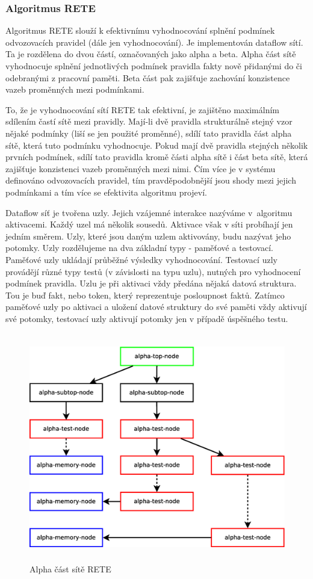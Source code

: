 \subsubsection{Algoritmus RETE}
\label{rete}

Algoritmus RETE slouží k efektivnímu vyhodnocování splnění podmínek odvozovacích
pravidel (dále jen vyhodnocování). Je implementován dataflow sítí. Ta je
rozdělena do dvou částí, označovaných jako alpha a beta. Alpha část sítě
vyhodnocuje splnění jednotlivých podmínek pravidla fakty nově přidanými do či
odebranými z pracovní paměti. Beta část pak zajišťuje zachování konzistence
vazeb proměnných mezi podmínkami.

To, že je vyhodnocování sítí RETE tak efektivní, je zajištěno maximálním
sdílením častí sítě mezi pravidly. Mají-li dvě pravidla strukturálně stejný vzor
nějaké podmínky (liší se jen použité proměnné), sdílí tato pravidla část alpha
sítě, která tuto podmínku vyhodnocuje. Pokud mají dvě pravidla stejných několik
prvních podmínek, sdílí tato pravidla kromě části alpha sítě i část beta sítě,
která zajišťuje konzistenci vazeb proměnných mezi nimi. Čím více je v systému
definováno odvozovacích pravidel, tím pravděpodobnější jsou shody mezi jejich
podmínkami a tím více se efektivita algoritmu projeví.

Dataflow síť je tvořena uzly. Jejich vzájemné interakce nazýváme v~algoritmu
aktivacemi. Každý uzel má několik sousedů. Aktivace však v síti probíhají jen
jedním směrem. Uzly, které jsou daným uzlem aktivovány, budu nazývat jeho
potomky. Uzly rozdělujeme na dva základní typy - paměťové a testovací. Paměťové
uzly ukládají průběžné výsledky vyhodnocování. Testovací uzly provádějí různé
typy testů (v závislosti na typu uzlu), nutných pro vyhodnocení podmínek
pravidla.  Uzlu je při aktivaci vždy předána nějaká datová struktura. Tou je buď
fakt, nebo token, který reprezentuje posloupnost faktů.  Zatímco paměťové uzly
po aktivaci a uložení datové struktury do své paměti vždy aktivují své potomky,
testovací uzly aktivují potomky jen v případě úspěšného testu.

\begin{figure}[h]
\centering
\includegraphics[height=10cm]{rete-alpha.eps}
\caption{Alpha část sítě RETE}
\label{rete-alpha}
\end{figure}

